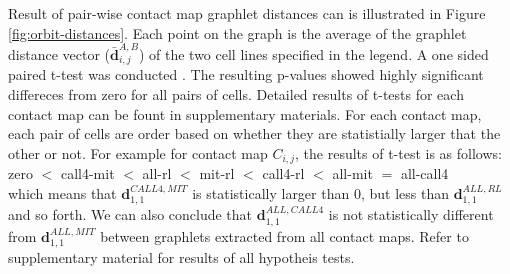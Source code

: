 \documentclass[a4,center,fleqn]{NAR}
\begin{document}
Result of pair-wise contact map graphlet distances can is
illustrated in Figure \ref{fig:orbit-distances}.
Each point on the graph is the
average of the graphlet distance vector 
($\bar{\mathbf{d}}^{\scriptscriptstyle A,B}_{i,j}$)
of the two cell lines specified in the legend.
 A one sided paired t-test
was conducted . The resulting p-values showed highly 
significant differeces from zero for all pairs of
cells. Detailed results of t-tests for each
contact map can be fount in supplementary materials.
For each contact map, each pair of cells are
order based on whether they are statistially
larger that the other or not. For example
for contact map $C_{i,j}$, the results 
of t-test is as follows:
\vspace{.2cm}\\
\small{
zero  $<$  call4-mit  $<$     all-rl  $<$     mit-rl  $<$   call4-rl  $<$    all-mit  $=$  all-call4
}
\vspace{.2cm}\\
which means that $\mathbf{d}^{\scriptscriptstyle CALL4, MIT}_{1,1}$ is statistically larger than 0,
but less than $\mathbf{d}^{\scriptscriptstyle ALL, RL}_{1,1}$ 
and so forth. We can also conclude that $\mathbf{d}^{\scriptscriptstyle ALL, CALL4}_{1,1}$ is not
statistically different from $\mathbf{d}^{\scriptscriptstyle ALL, MIT}_{1,1}$
between graphlets extracted from all contact maps. 
Refer to supplementary
material for results of all hypotheis tests.
\end{document}
